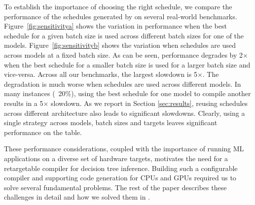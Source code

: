 To establish the importance of choosing the right schedule, we
compare the performance of the schedules generated by \Treebeard{}
on several real-world benchmarks. 
Figure~\ref{fig:sensitivitya} shows the
variation in performance when the best schedule for a given batch 
size is used across different batch sizes for one of the models. 
Figure~\ref{fig:sensitivityb} shows the variation when schedules 
are used across models at a fixed batch size.
As can be seen, performance degrades by 2$\times$ when the best schedule for a
smaller batch size is used for a larger batch size and vice-versa.
Across all our benchmarks, the largest slowdown is 5$\times$.  %
The degradation is much worse when schedules are used across different models.
In many instances (~20\%), using the best schedule for one model 
to compile another results in a 5$\times$ slowdown.
As we report in Section \ref{sec:results}, reusing schedules across
different architecture also leads to significant slowdowns.
Clearly, using a single strategy across models, batch sizes and targets
leaves significant performance on the table. 

These performance considerations, coupled with 
the importance of running ML applications on a diverse set of hardware targets,
motivates the need for a retargetable compiler for decision tree inference.
Building such a configurable compiler and supporting code generation for CPUs and GPUs 
required us to solve several fundamental problems. 
The rest of the paper describes these challenges in detail and how we
solved them in \Treebeard{}.

